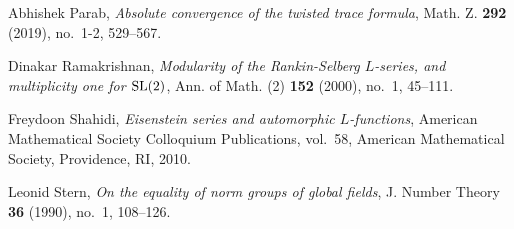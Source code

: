 \documentclass{ims9x6}
\begin{document}
\begin{thebibliography}{}
Abhishek Parab, \emph{Absolute convergence of the twisted trace formula}, Math.
  Z. \textbf{292} (2019), no.~1-2, 529--567. 

Dinakar Ramakrishnan, \emph{Modularity of the {R}ankin-{S}elberg {$L$}-series,
  and multiplicity one for {${\rm SL}(2)$}}, Ann. of Math. (2) \textbf{152}
  (2000), no.~1, 45--111. 

Freydoon Shahidi, \emph{Eisenstein series and automorphic {$L$}-functions},
  American Mathematical Society Colloquium Publications, vol.~58, American
  Mathematical Society, Providence, RI, 2010. 

Leonid Stern, \emph{On the equality of norm groups of global fields}, J. Number
  Theory \textbf{36} (1990), no.~1, 108--126. 

\end{thebibliography}
\end{document}
